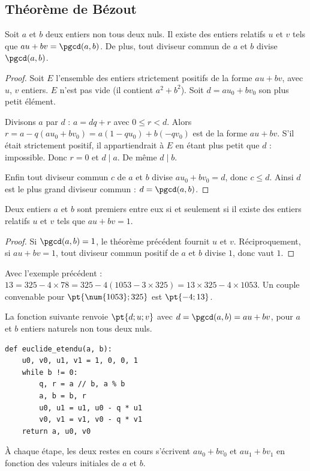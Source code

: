 \subsection{Théorème de Bézout}
\begin{theorem}
Soit $a$ et $b$ deux entiers non tous deux nuls. Il existe des entiers relatifs $u$ et $v$ tels que $au+bv=\pgcd(a,b)$. De plus, tout diviseur commun de $a$ et $b$ divise $\pgcd(a,b)$.
\end{theorem}
\begin{proof}
Soit $E$ l'ensemble des entiers strictement positifs de la forme $au+bv$, avec $u$, $v$ entiers. $E$ n'est pas vide (il contient $a^2+b^2$). Soit $d=au_0+bv_0$ son plus petit élément.\par
Divisons $a$ par $d$ : $a=dq+r$ avec $0\le r<d$. Alors $r=a-q(au_0+bv_0)=a(1-qu_0)+b(-qv_0)$ est de la forme $au+bv$. S'il était strictement positif, il appartiendrait à $E$ en étant plus petit que $d$ : impossible. Donc $r=0$ et $d\mid a$. De même $d\mid b$.\par
Enfin tout diviseur commun $c$ de $a$ et $b$ divise $au_0+bv_0=d$, donc $c\le d$. Ainsi $d$ est le plus grand diviseur commun : $d=\pgcd(a,b)$.
\end{proof}
\begin{theorem}
Deux entiers $a$ et $b$ sont premiers entre eux si et seulement si il existe des entiers relatifs $u$ et $v$ tels que $au+bv=1$.
\end{theorem}
\begin{proof}
Si $\pgcd(a,b)=1$, le théorème précédent fournit $u$ et $v$. Réciproquement, si $au+bv=1$, tout diviseur commun positif de $a$ et $b$ divise $1$, donc vaut $1$.
\end{proof}
\begin{method}
Avec l'exemple précédent : $13=325-4\times78=325-4(\num{1053}-3\times325)=13\times325-4\times\num{1053}$. Un couple convenable pour $\pt{\num{1053};325}$ est $\pt{-4;13}$.
\end{method}
\begin{keypoint}
La fonction suivante renvoie $\pt{d;u;v}$ avec $d=\pgcd(a,b)=au+bv$, pour $a$ et $b$ entiers naturels non tous deux nuls.
\begin{lstlisting}
def euclide_etendu(a, b):
    u0, v0, u1, v1 = 1, 0, 0, 1
    while b != 0:
        q, r = a // b, a % b
        a, b = b, r
        u0, u1 = u1, u0 - q * u1
        v0, v1 = v1, v0 - q * v1
    return a, u0, v0
\end{lstlisting}
À chaque étape, les deux restes en cours s'écrivent $au_0+bv_0$ et $au_1+bv_1$ en fonction des valeurs initiales de $a$ et $b$.
\end{keypoint}

